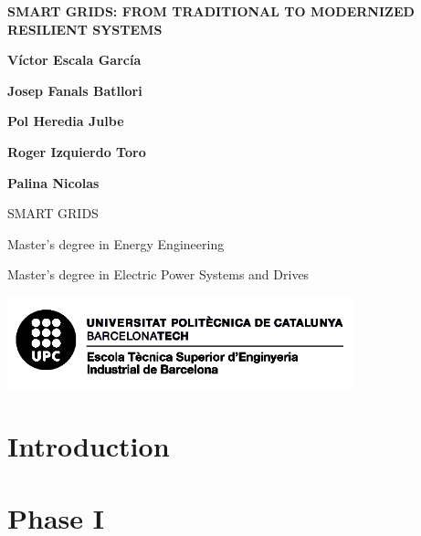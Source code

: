 \documentclass[10pt, a4paper]{report}
\begin{document}
\begin{titlepage}
   \begin{center}
      \vspace*{2em}
      {\Large \bfseries SMART GRIDS: FROM TRADITIONAL TO MODERNIZED RESILIENT SYSTEMS}

       \vspace{6em}

       \textbf{Víctor Escala García}

       \textbf{Josep Fanals Batllori}

       \textbf{Pol Heredia Julbe}

       \textbf{Roger Izquierdo Toro}

       \textbf{Palina Nicolas}

       \vfill

       \vspace{1em}

       SMART GRIDS

       Master's degree in Energy Engineering

       Master's degree in Electric Power Systems and Drives

       \vspace{8em}
     
       \includegraphics[width=10cm]{Data/Logo.png}
            
   \end{center}
\end{titlepage}



\tableofcontents{}


\chapter{Introduction}


\chapter{Phase I}



\printbibliography
\end{document}
